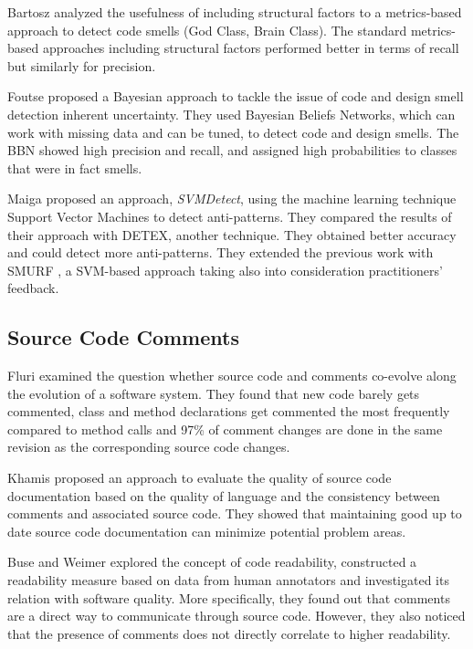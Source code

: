 Bartosz \etal \cite{walter2015including} analyzed the usefulness of including structural factors to a metrics-based approach to detect code smells (God Class, Brain Class). The standard metrics-based approaches including structural factors performed better in terms of recall but similarly for precision.

Foutse \etal \cite{khomh2009bayesian} proposed a Bayesian approach to tackle the issue of code and design smell detection inherent uncertainty. They used Bayesian Beliefs Networks, which can work with missing data and can be tuned, to detect code and design smells. The BBN showed high precision and recall, and assigned high probabilities to classes that were in fact smells.

Maiga \etal \cite{maiga2012support} proposed an approach, \textit{SVMDetect}, using the machine learning technique Support Vector Machines to detect anti-patterns. They compared the results of their approach with DETEX, another technique. They obtained better accuracy and could detect more anti-patterns. They extended the previous work with SMURF \cite{maiga2012smurf}, a SVM-based approach taking also into consideration practitioners' feedback.

\subsection{Source Code Comments}
Fluri \etal \cite{fluri2007code} examined the question whether source code and comments co-evolve along the evolution of a software system. They found that new code barely gets commented, class and method declarations get commented the most frequently compared to method calls and 97\% of comment changes are done in the same revision as the corresponding source code changes.

Khamis \etal \cite{khamis2010automatic} proposed an approach to evaluate the quality of source code documentation based on the quality of language and the consistency between comments and associated source code. They showed that maintaining good up to date source code documentation can minimize potential problem areas.

Buse and Weimer \cite{buse2008metric} explored the concept of code readability, constructed a readability measure based on data from human annotators and investigated its relation with software quality. More specifically, they found out that comments are a direct way to communicate through source code. However, they also noticed that the presence of comments does not directly correlate to higher readability.

